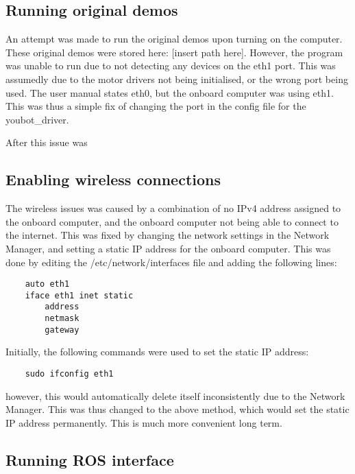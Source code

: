 \documentclass[a4paper, 12pt]{article}
\newif\ifshownotes
\newcommand{\notes}[1]{\ifshownotes\textcolor{blue}{#1}\fi}
\begin{document}
    \notes{discuss powering up, initial software inspection, static IP issue}
    
    
    \pagebreak

    \subsection{Running original demos}
    \notes{describe fixing network issue, and hten running the original demos.}

    An attempt was made to run the original demos upon turning on the computer. These original demos were stored here: [insert path here].
    However, the program was unable to run due to not detecting any devices on the eth1 port. This was assumedly due to the motor drivers not being initialised, or the wrong port being used. The user manual states eth0, but the onboard computer was using eth1. This was thus a simple fix of changing the port in the config file for the youbot\_driver. 

    
    After this issue was 


    \subsection{Enabling wireless connections}

    The wireless issues was caused by a combination of no IPv4 address assigned to the onboard computer, and the onboard computer not being able to connect to the internet. This was fixed by changing the network settings in the Network Manager, and setting a static IP address for the onboard computer. This was done by editing the /etc/network/interfaces file and adding the following lines:

    \begin{verbatim}
    auto eth1
    iface eth1 inet static
        address
        netmask
        gateway
    \end{verbatim}

    Initially, the following commands were used to set the static IP address: 
    \begin{verbatim}
    sudo ifconfig eth1
    \end{verbatim}
    however, this would automatically delete itself inconsistently due to the Network Manager. This was thus changed to the above method, which would set the static IP address permanently. This is much more convenient long term. 


    \pagebreak


    \subsection{Running ROS interface}
\end{document}
